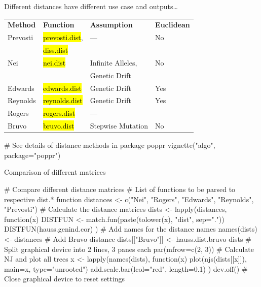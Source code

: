 \documentclass[compress, ucs, xelatex, 11pt, xcolor=svgnames,
  hyperref={
    bookmarks=true,
    unicode=true,
    colorlinks=true,
    pdftitle={Molecular data in R},
    plainpages=false,
    pdfauthor={Vojtech Zeisek},
    pdfsubject={Course about phylogeny and evolution in R},
    pdfcreator={XeLaTeX},
    pdfkeywords={R, evolution, phylogeny, molecular data},
    linkcolor=Tomato,
    anchorcolor=SaddleBrown,
    citecolor=Goldenrod,
    filecolor=DarkMagenta,
    menucolor=Sienna,
    urlcolor=DarkTurquoise,
    pdftex},
  url={hyphens, lowtilde} %
  ]{beamer}
\renewcommand{\texttt}[1]{\hl{\ttfamily #1}}
\begin{document}
\begin{frame}[fragile]{Different distances have different use case and outputs\ldots}
  \begin{tabular}{llll} %
    \textbf{Method} & \textbf{Function} & \textbf{Assumption} & \textbf{Euclidean}\\
    Prevosti & \texttt{prevosti.dist}, & --- & No\\
     & \texttt{diss.dist} & & \\
    Nei & \texttt{nei.dist} & Infinite Alleles, & No\\
     & & Genetic Drift & \\
    Edwards & \texttt{edwards.dist} & Genetic Drift & Yes\\
    Reynolds & \texttt{reynolds.dist} & Genetic Drift & Yes\\
    Rogers & \texttt{rogers.dist} & --- &\\
    Bruvo & \texttt{bruvo.dist} & Stepwise Mutation & No
  \end{tabular}
  \begin{spluscode}
    # See details of distance methods in package poppr
    vignette("algo", package="poppr")
  \end{spluscode}
\end{frame}

\begin{frame}[fragile]{Comparison of different matrices}
  \begin{spluscode}
    # Compare different distance matrices
    # List of functions to be parsed to respective dist.* function
    distances <- c("Nei", "Rogers", "Edwards", "Reynolds", "Prevosti")
    # Calculate the distance matrices
    dists <- lapply(distances, function(x) {
      DISTFUN <- match.fun(paste(tolower(x), "dist", sep="."))
      DISTFUN(hauss.genind.cor) })
    # Add names for the distance names
    names(dists) <- distances
    # Add Bruvo distance
    dists[["Bruvo"]] <- hauss.dist.bruvo
    dists
    # Split graphical device into 2 lines, 3 panes each
    par(mfrow=c(2, 3))
    # Calculate NJ and plot all trees
    x <- lapply(names(dists), function(x) {
      plot(njs(dists[[x]]), main=x, type="unrooted")
      add.scale.bar(lcol="red", length=0.1) })
    dev.off() # Close graphical device to reset settings
  \end{spluscode}
\end{frame}
\end{document}
